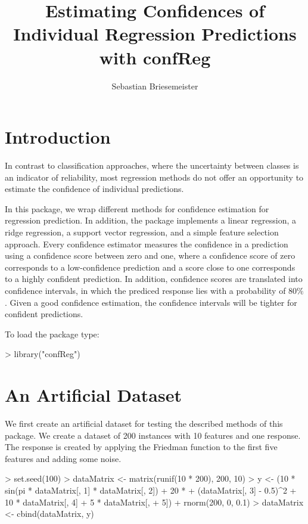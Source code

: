 \documentclass{article}
\begin{document}
\title{Estimating Confidences of Individual Regression Predictions with confReg}
\author{Sebastian Briesemeister}
\maketitle

\section{Introduction}

In contrast to classification approaches, where the uncertainty 
between classes is an indicator of reliability, most regression
methods do not offer an opportunity to estimate the confidence of
individual predictions.

In this package, we wrap different methods for confidence estimation
for regression prediction. In addition, the package implements a linear
regression, a ridge regression, a support vector regression, and a
simple feature selection approach. Every confidence
estimator measures the confidence in a prediction using a confidence
score between zero and one, where a confidence score of zero 
corresponds to a low-confidence prediction and a score close to one
corresponds to a highly confident prediction. In addition, confidence
scores are translated into confidence intervals, in which the
prediced response lies with a probability of $80\%$. Given a good
confidence estimation, the confidence intervals will be tighter for
confident predictions.

To load the package type:

\begin{Schunk}
\begin{Sinput}
> library("confReg")
\end{Sinput}
\end{Schunk}


\section{An Artificial Dataset}

We first create an artificial dataset for testing the described
methods of this package. We create a dataset of 200 instances
with 10 features and one response. The response is created by applying
the Friedman function to the first five features and adding some noise.

\begin{Schunk}
\begin{Sinput}
> set.seed(100)
> dataMatrix <- matrix(runif(10 * 200), 200, 10)
> y <- (10 * sin(pi * dataMatrix[, 1] * dataMatrix[, 2]) + 20 * 
+     (dataMatrix[, 3] - 0.5)^2 + 10 * dataMatrix[, 4] + 5 * dataMatrix[, 
+     5]) + rnorm(200, 0, 0.1)
> dataMatrix <- cbind(dataMatrix, y)
\end{Sinput}
\end{Schunk}
\end{document}
